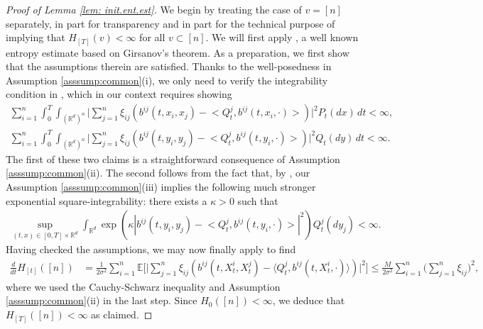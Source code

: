 \documentclass[11pt,reqno]{amsart}
\numberwithin{equation}{section}
\theoremstyle{definition}
\def\E{{\mathbb E}}
\def\R{{\mathbb R}}
\begin{document}
	
	\begin{proof}[Proof of Lemma \ref{lem: init.ent.est}]
	We begin by treating the case of $v=[n]$ separately, in part for transparency and in part for the technical purpose of implying that  $H_{[T]}(v) < \infty$ for all $v \subset [n]$. We will first apply \cite[Lemma 4.4(iii)]{lacker2022hierarchies}, a well known entropy estimate based on Girsanov's theorem. As a preparation, we first show that the assumptions therein are satisfied. Thanks to the well-posedness  in Assumption \ref{asssump:common}(i), we only need to verify the integrability condition in \cite[Equation (4.9)]{lacker2022hierarchies}, which in our context requires showing
		\begin{align*} 
			\sum_{i=1}^n  \int_0^T  \int_{(\R^d)^n} \bigg| \sum_{j=1}^n\xi_{ij} \left( b^{ij}(t, x_i, x_j) - \big< Q^j_t, b^{ij}(t, x_i, \cdot) \big> \right) \bigg|^2 P_t(dx) \, dt  < \infty, \\
			\sum_{i=1}^n \int_0^T \int_{(\R^d)^n}  \bigg| \sum_{j=1}^n\xi_{ij} \left( b^{ij}(t, y_i, y_j) - \big< Q^j_t, b^{ij}(t, y_i, \cdot) \big> \right) \bigg|^2 Q_t(dy) \, dt  < \infty. 
		\end{align*}
		The first of these two claims  is a straightforward consequence of  Assumption \ref{asssump:common}(ii). The second follows from the fact that,
by \cite[Lemma 2.3 and Remark 2.4(i)]{lacker2022hierarchies}, our Assumption \ref{asssump:common}(iii) implies the following much stronger exponential square-integrability: there exists a $  \kappa > 0$ such that 
		\begin{align*}
			\sup_{(t, x)\in[0,T]\times\R^d} \int_{\R^d} \exp\left( \kappa\left| b^{ij}(t,y_i,y_j)- \big<Q^j_t, b^{ij}(t,y_i,\cdot)\big> \right|^2 \right) Q^j_t(dy_j) <\infty.
		\end{align*}
Having checked the assumptions, we may now finally apply \cite[Lemma 4.4(iii)]{lacker2022hierarchies} to find 
		\begin{align*}
			\frac{d}{dt} H_{[t]}([n]) & = \frac{1}{2 \sigma^2} \sum_{i=1}^n \E \bigg[ \Big|  \sum_{j=1}^n\xi_{ij} 
			\left( b^{ij}(t, X^i_t, X^j_t) - \big\langle Q^{j}_t, b^{ij}(t, X^i_t, \cdot)\big\rangle \right) \Big|^2\bigg] \leq \frac{M}{2\sigma^2}\sum_{i=1}^n\Big(\sum_{j=1}^n\xi_{ij}\Big)^2,
		\end{align*}
		where we used the Cauchy-Schwarz inequality and Assumption \ref{asssump:common}(ii) in the last step. Since $H_0([n]) < \infty$, we deduce that $H_{[T]}([n]) <\infty$ as claimed. 
		

\end{proof}
\end{document}
